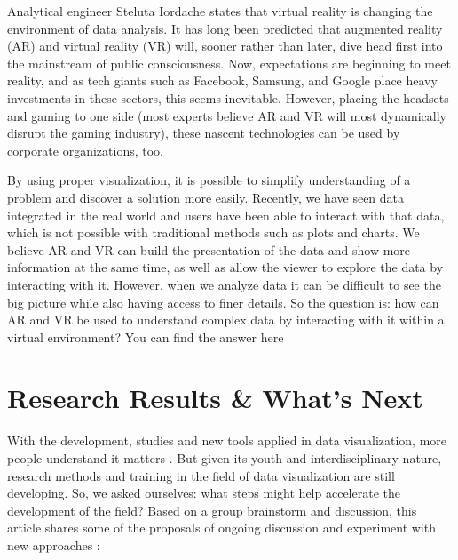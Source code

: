 \documentclass[]{book}
\theoremstyle{definition}
\theoremstyle{definition}
\theoremstyle{definition}
\theoremstyle{remark}
\begin{document}
Analytical engineer Steluta Iordache states that virtual reality is
changing the environment of data analysis. It has long been predicted
that augmented reality (AR) and virtual reality (VR) will, sooner rather
than later, dive head first into the mainstream of public consciousness.
Now, expectations are beginning to meet reality, and as tech giants such
as Facebook, Samsung, and Google place heavy investments in these
sectors, this seems inevitable. However, placing the headsets and gaming
to one side (most experts believe AR and VR will most dynamically
disrupt the gaming industry), these nascent technologies can be used by
corporate organizations, too.

By using proper visualization, it is possible to simplify understanding
of a problem and discover a solution more easily. Recently, we have seen
data integrated in the real world and users have been able to interact
with that data, which is not possible with traditional methods such as
plots and charts. We believe AR and VR can build the presentation of the
data and show more information at the same time, as well as allow the
viewer to explore the data by interacting with it. However, when we
analyze data it can be difficult to see the big picture while also
having access to finer details. So the question is: how can AR and VR be
used to understand complex data by interacting with it within a virtual
environment? You can find the answer here\citep{vr_education}

\section{Research Results \& What's
Next}\label{research-results-whats-next}

With the development, studies and new tools applied in data
visualization, more people understand it matters \citep{next_steps} .
But given its youth and interdisciplinary nature, research methods and
training in the field of data visualization are still developing. So, we
asked ourselves: what steps might help accelerate the development of the
field? Based on a group brainstorm and discussion, this article shares
some of the proposals of ongoing discussion and experiment with new
approaches \citep{next_steps}:
\end{document}
